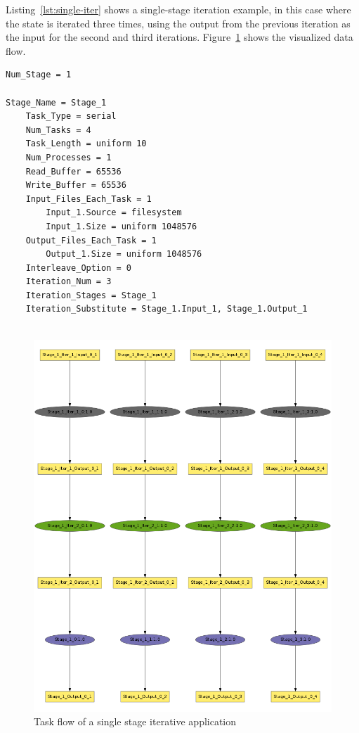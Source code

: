 \documentclass[10pt,a4paper]{article}
\begin{document}
Listing~\ref{lst:single-iter} shows a single-stage iteration example, in this case where the state is iterated three times, using the output from the previous iteration as the input for the second and third iterations. Figure~\ref{fig:single-iter} shows the visualized data flow.

\begin{lstlisting}[caption=Sample input for a single stage iterative application, label=lst:single-iter, linewidth=1.0\textwidth, xleftmargin=2.5ex]
Num_Stage = 1

Stage_Name = Stage_1
    Task_Type = serial
    Num_Tasks = 4
    Task_Length = uniform 10
    Num_Processes = 1
    Read_Buffer = 65536
    Write_Buffer = 65536
    Input_Files_Each_Task = 1
        Input_1.Source = filesystem
        Input_1.Size = uniform 1048576
    Output_Files_Each_Task = 1
        Output_1.Size = uniform 1048576
    Interleave_Option = 0
    Iteration_Num = 3
    Iteration_Stages = Stage_1
    Iteration_Substitute = Stage_1.Input_1, Stage_1.Output_1
 
\end{lstlisting}

\begin{figure}
   \includegraphics[width=120mm]{picture/single-iterate}
\caption {Task flow of a single stage iterative application
   \label{fig:single-iter}
}
\end{figure}
\end{document}
